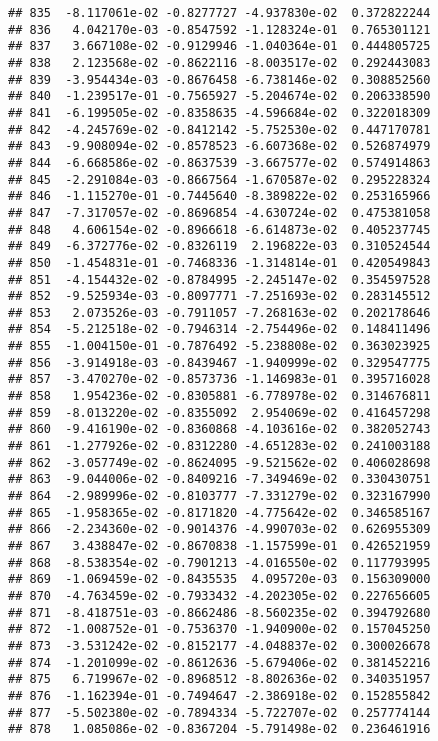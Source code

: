 \documentclass[
]{article}
\begin{document}
\begin{verbatim}
## 835  -8.117061e-02 -0.8277727 -4.937830e-02  0.372822244
## 836   4.042170e-03 -0.8547592 -1.128324e-01  0.765301121
## 837   3.667108e-02 -0.9129946 -1.040364e-01  0.444805725
## 838   2.123568e-02 -0.8622116 -8.003517e-02  0.292443083
## 839  -3.954434e-03 -0.8676458 -6.738146e-02  0.308852560
## 840  -1.239517e-01 -0.7565927 -5.204674e-02  0.206338590
## 841  -6.199505e-02 -0.8358635 -4.596684e-02  0.322018309
## 842  -4.245769e-02 -0.8412142 -5.752530e-02  0.447170781
## 843  -9.908094e-02 -0.8578523 -6.607368e-02  0.526874979
## 844  -6.668586e-02 -0.8637539 -3.667577e-02  0.574914863
## 845  -2.291084e-03 -0.8667564 -1.670587e-02  0.295228324
## 846  -1.115270e-01 -0.7445640 -8.389822e-02  0.253165966
## 847  -7.317057e-02 -0.8696854 -4.630724e-02  0.475381058
## 848   4.606154e-02 -0.8966618 -6.614873e-02  0.405237745
## 849  -6.372776e-02 -0.8326119  2.196822e-03  0.310524544
## 850  -1.454831e-01 -0.7468336 -1.314814e-01  0.420549843
## 851  -4.154432e-02 -0.8784995 -2.245147e-02  0.354597528
## 852  -9.525934e-03 -0.8097771 -7.251693e-02  0.283145512
## 853   2.073526e-03 -0.7911057 -7.268163e-02  0.202178646
## 854  -5.212518e-02 -0.7946314 -2.754496e-02  0.148411496
## 855  -1.004150e-01 -0.7876492 -5.238808e-02  0.363023925
## 856  -3.914918e-03 -0.8439467 -1.940999e-02  0.329547775
## 857  -3.470270e-02 -0.8573736 -1.146983e-01  0.395716028
## 858   1.954236e-02 -0.8305881 -6.778978e-02  0.314676811
## 859  -8.013220e-02 -0.8355092  2.954069e-02  0.416457298
## 860  -9.416190e-02 -0.8360868 -4.103616e-02  0.382052743
## 861  -1.277926e-02 -0.8312280 -4.651283e-02  0.241003188
## 862  -3.057749e-02 -0.8624095 -9.521562e-02  0.406028698
## 863  -9.044006e-02 -0.8409216 -7.349469e-02  0.330430751
## 864  -2.989996e-02 -0.8103777 -7.331279e-02  0.323167990
## 865  -1.958365e-02 -0.8171820 -4.775642e-02  0.346585167
## 866  -2.234360e-02 -0.9014376 -4.990703e-02  0.626955309
## 867   3.438847e-02 -0.8670838 -1.157599e-01  0.426521959
## 868  -8.538354e-02 -0.7901213 -4.016550e-02  0.117793995
## 869  -1.069459e-02 -0.8435535  4.095720e-03  0.156309000
## 870  -4.763459e-02 -0.7933432 -4.202305e-02  0.227656605
## 871  -8.418751e-03 -0.8662486 -8.560235e-02  0.394792680
## 872  -1.008752e-01 -0.7536370 -1.940900e-02  0.157045250
## 873  -3.531242e-02 -0.8152177 -4.048837e-02  0.300026678
## 874  -1.201099e-02 -0.8612636 -5.679406e-02  0.381452216
## 875   6.719967e-02 -0.8968512 -8.802636e-02  0.340351957
## 876  -1.162394e-01 -0.7494647 -2.386918e-02  0.152855842
## 877  -5.502380e-02 -0.7894334 -5.722707e-02  0.257774144
## 878   1.085086e-02 -0.8367204 -5.791498e-02  0.236461916

\end{verbatim}
\end{document}
